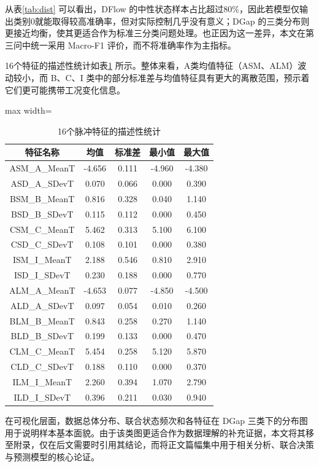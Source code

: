 \documentclass[UTF8,a4paper,12pt]{ctexart}
\begin{document}
从表\ref{tab:dist} 可以看出，DFlow 的中性状态样本占比超过80\%，因此若模型仅输出类别0就能取得较高准确率，但对实际控制几乎没有意义；DGap 的三类分布则更接近均衡，使其更适合作为标准三分类问题处理。也正因为这一差异，本文在第三问中统一采用 Macro-F1 评价，而不将准确率作为主指标。

16个特征的描述性统计如表\ref{tab:desc} 所示。整体来看，A类均值特征（ASM、ALM）波动较小，而 B、C、I 类中的部分标准差与均值特征具有更大的离散范围，预示着它们更可能携带工况变化信息。

\begin{table}[H]
\centering
\caption{16个脉冲特征的描述性统计}
\label{tab:desc}
\begin{adjustbox}{max width=\textwidth}
\begin{tabular}{ccccc}
\toprule
特征名称 & 均值 & 标准差 & 最小值 & 最大值 \\
\midrule
ASM\_A\_MeanT & -4.656 & 0.111 & -4.960 & -4.380 \\
ASD\_A\_SDevT & 0.070 & 0.066 & 0.000 & 0.390 \\
BSM\_B\_MeanT & 0.816 & 0.328 & 0.040 & 1.140 \\
BSD\_B\_SDevT & 0.115 & 0.112 & 0.000 & 0.450 \\
CSM\_C\_MeanT & 5.462 & 0.313 & 5.100 & 6.100 \\
CSD\_C\_SDevT & 0.108 & 0.101 & 0.000 & 0.380 \\
ISM\_I\_MeanT & 2.188 & 0.546 & 0.810 & 2.910 \\
ISD\_I\_SDevT & 0.230 & 0.188 & 0.000 & 0.770 \\
ALM\_A\_MeanT & -4.653 & 0.077 & -4.850 & -4.500 \\
ALD\_A\_SDevT & 0.097 & 0.054 & 0.010 & 0.260 \\
BLM\_B\_MeanT & 0.843 & 0.258 & 0.270 & 1.140 \\
BLD\_B\_SDevT & 0.199 & 0.133 & 0.000 & 0.470 \\
CLM\_C\_MeanT & 5.454 & 0.258 & 5.120 & 5.870 \\
CLD\_C\_SDevT & 0.188 & 0.110 & 0.000 & 0.370 \\
ILM\_I\_MeanT & 2.260 & 0.394 & 1.070 & 2.790 \\
ILD\_I\_SDevT & 0.396 & 0.211 & 0.030 & 0.940 \\
\bottomrule
\end{tabular}
\end{adjustbox}
\end{table}

在可视化层面，数据总体分布、联合状态频次和各特征在 DGap 三类下的分布图用于说明样本基本面貌。由于该类图更适合作为数据理解的补充证据，本文将其移至附录，仅在后文需要时引用其结论，而将正文篇幅集中用于相关分析、联合决策与预测模型的核心论证。
\end{document}
